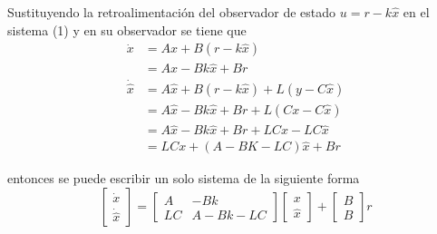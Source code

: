 Sustituyendo la retroalimentación del observador de estado \( u = r-k \hat{x} \) en el sistema (1) y en su observador se tiene que 
\[
    \begin{split}
        \dot{x} & = Ax + B(r-k\hat{x}) \\
        & = Ax - Bk\hat{x} + Br \\ 
        \dot{\hat{x}} & = A\hat{x} + B(r-k\hat{x}) + L(y-C\hat{x}) \\
        & = A\hat{x} - Bk\hat{x} + Br + L(Cx-C\hat{x}) \\
        & = A\hat{x} - Bk\hat{x} + Br + LCx - LC\hat{x} \\
        & = LCx + (A - BK - LC)\hat{x} +Br
    \end{split}
\]

entonces se puede escribir un solo sistema de la siguiente forma
\[
    \begin{bmatrix}
        \dot{x} \\ \dot{\hat{x}}
    \end{bmatrix} =
    \begin{bmatrix}
        A & -Bk \\
        LC & A-Bk-LC 
    \end{bmatrix}
    \begin{bmatrix}
        x \\ \hat{x}
    \end{bmatrix} +
    \begin{bmatrix}
        B \\ B
    \end{bmatrix} r
\]